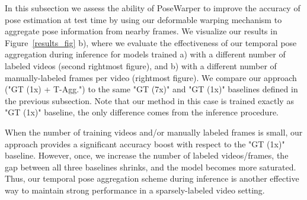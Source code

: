 \documentclass{article}
\begin{document}
In this subsection we assess the ability of PoseWarper to improve the accuracy of pose estimation at test time by using our deformable warping mechanism to aggregate pose information from nearby frames. We visualize our results in Figure~\ref{results_fig} b), where we evaluate the effectiveness of our temporal pose aggregation during inference for models trained  a) with a different number of labeled videos (second rightmost figure), and b) with a different number of manually-labeled frames per video (rightmost figure). We compare our approach ("GT (1x) + T-Agg.") to the same "GT (7x)" and "GT (1x)" baselines defined in the previous subsection. Note that our method in this case is trained exactly as "GT (1x)" baseline, the only difference comes from the inference procedure.



When the number of training videos and/or manually labeled frames is small, our approach provides a significant accuracy boost with respect to the "GT (1x)" baseline. However, once, we increase the number of labeled videos/frames, the gap between all three baselines shrinks, and the model becomes more saturated. Thus, our temporal pose aggregation scheme during inference is another effective way to maintain strong performance in a sparsely-labeled video setting.
\end{document}
